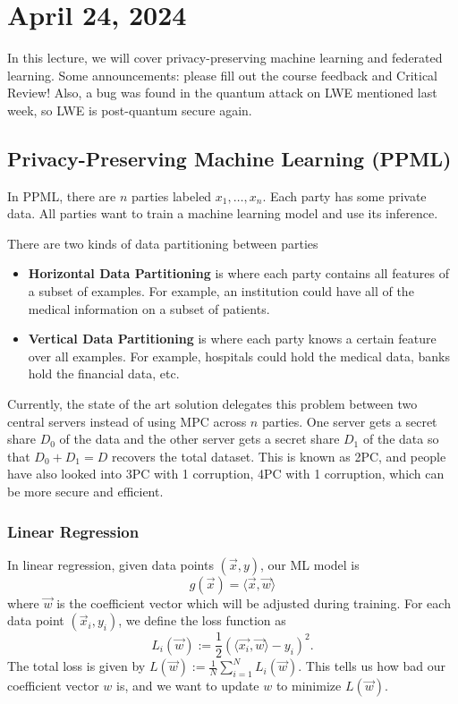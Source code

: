\section{April 24, 2024}
\label{20240424}

In this lecture, we will cover privacy-preserving machine learning and federated learning. Some announcements: please fill out the course feedback and Critical Review! Also, a bug was found in the quantum attack on LWE mentioned last week, so LWE is post-quantum secure again.

\subsection{Privacy-Preserving Machine Learning (PPML)}

In PPML, there are $n$ parties labeled $x_1, \dots, x_n$. Each party has some private data. All parties want to train a machine learning model and use its inference.

There are two kinds of data partitioning between parties
\begin{itemize}
    \item \textbf{Horizontal Data Partitioning} is where each party contains all features of a subset of examples. For example, an institution could have all of the medical information on a subset of patients.
    \item \textbf{Vertical Data Partitioning} is where each party knows a certain feature over all examples. For example, hospitals could hold the medical data, banks hold the financial data, etc.
\end{itemize}

Currently, the state of the art solution delegates this problem between two central servers instead of using MPC across $n$ parties. One server gets a secret share $D_0$ of the data and the other server gets a secret share $D_1$ of the data so that $D_0 + D_1 = D$ recovers the total dataset. This is known as 2PC, and people have also looked into 3PC with 1 corruption, 4PC with 1 corruption, which can be more secure and efficient.

\subsubsection{Linear Regression}

In linear regression, given data points $(\vec{x}, y)$, our ML model is 
$$g(\vec{x}) = \langle \vec{x}, \vec{w}\rangle$$
where $\vec{w}$ is the coefficient vector which will be adjusted during training. For each data point $(\vec{x}_i, y_i)$, we define the loss function as 
$$L_i(\vec{w}) := \frac{1}{2}(\langle \vec{x_i}, \vec{w}\rangle - y_i)^2.$$
The total loss is given by $L(\vec{w}):= \frac{1}{N}\sum_{i = 1}^{N} L_i (\vec{w})$. This tells us how bad our coefficient vector $w$ is, and we want to update $w$ to minimize $L(\vec{w})$.

